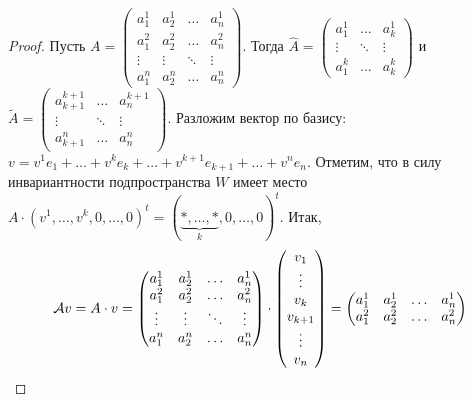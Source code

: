 \begin{proof}
    Пусть 
    $
    A =
    \begin{pmatrix}
        a^1_1 & a^1_2 & \ldots & a^1_n\\
        a^2_1 & a^2_2 & \ldots & a^2_n\\
        \vdots & \vdots & \ddots & \vdots\\
        a^n_1 & a^n_2 & \ldots & a^n_n
    \end{pmatrix}
    $. Тогда
    $
    \widehat{A} =
    \begin{pmatrix}
        a^1_1 & \ldots & a^1_k\\
        \vdots & \ddots & \vdots\\
        a^k_1 & \ldots & a^k_k
    \end{pmatrix}
    $ и
    $
    \widetilde{A} =
    \begin{pmatrix}
        a^{k + 1}_{k + 1} & \ldots & a^{k + 1}_n\\
        \vdots & \ddots & \vdots\\
        a^n_{k + 1} & \ldots & a^n_n
    \end{pmatrix}
    $. Разложим вектор по базису: $v = v^1e_1 + \ldots + v^ke_k + \ldots + v^{k + 1}e_{k + 1} + \ldots + v^ne_n$. Отметим, что в силу инвариантности подпространства $W$ имеет место
    $
    A \cdot (v^1, \ldots, v^k, 0, \ldots, 0)^t = (\underbrace{\ast, \ldots, \ast}_{k}, 0, \ldots, 0)^t
    $. Итак,
    \begin{multline*}
        \mathcal{A} v = A \cdot v =
        \begin{pmatrix}
            a^1_1 & a^1_2 & \ldots & a^1_n\\
            a^2_1 & a^2_2 & \ldots & a^2_n\\
            \vdots & \vdots & \ddots & \vdots\\
            a^n_1 & a^n_2 & \ldots & a^n_n
        \end{pmatrix} \cdot
        \begin{pmatrix}
            v_1\\
            \vdots\\
            v_k\\
            v_{k + 1}\\
            \vdots\\
            v_n
        \end{pmatrix} = 
        \begin{pmatrix}
            a^1_1 & a^1_2 & \ldots & a^1_n\\
            a^2_1 & a^2_2 & \ldots & a^2_n\\

\end{pmatrix}
\end{multline*}
\end{proof}

